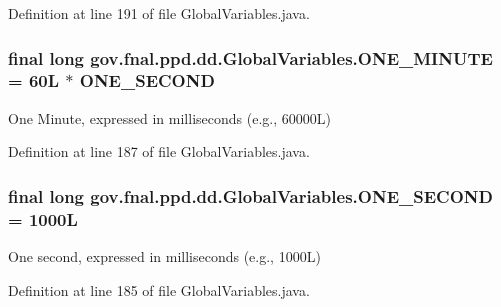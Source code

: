 Definition at line 191 of file Global\-Variables.\-java.

\hypertarget{classgov_1_1fnal_1_1ppd_1_1dd_1_1GlobalVariables_a79fc1e35198b44168537a85aa4c2d942}{
\subsubsection[{O\-N\-E\-\_\-\-M\-I\-N\-U\-T\-E}]{\setlength{\rightskip}{0pt plus 5cm}final long gov.\-fnal.\-ppd.\-dd.\-Global\-Variables.\-O\-N\-E\-\_\-\-M\-I\-N\-U\-T\-E = 60\-L $\ast$ O\-N\-E\-\_\-\-S\-E\-C\-O\-N\-D\hspace{0.3cm}{\ttfamily [static]}}}\label{classgov_1_1fnal_1_1ppd_1_1dd_1_1GlobalVariables_a79fc1e35198b44168537a85aa4c2d942}
One Minute, expressed in milliseconds (e.\-g., 60000\-L) 

Definition at line 187 of file Global\-Variables.\-java.

\hypertarget{classgov_1_1fnal_1_1ppd_1_1dd_1_1GlobalVariables_a3718d8133f257fcc337f5131c8e22d48}{
\subsubsection[{O\-N\-E\-\_\-\-S\-E\-C\-O\-N\-D}]{\setlength{\rightskip}{0pt plus 5cm}final long gov.\-fnal.\-ppd.\-dd.\-Global\-Variables.\-O\-N\-E\-\_\-\-S\-E\-C\-O\-N\-D = 1000\-L\hspace{0.3cm}{\ttfamily [static]}}}\label{classgov_1_1fnal_1_1ppd_1_1dd_1_1GlobalVariables_a3718d8133f257fcc337f5131c8e22d48}
One second, expressed in milliseconds (e.\-g., 1000\-L) 

Definition at line 185 of file Global\-Variables.\-java.


